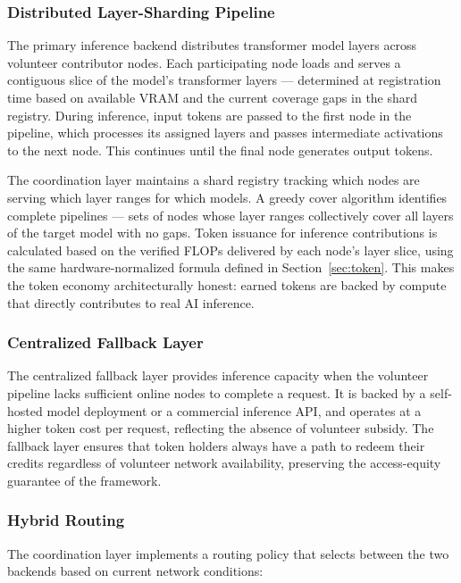 \documentclass[12pt]{article}
\begin{document}
\subsubsection{Distributed Layer-Sharding Pipeline}

The primary inference backend distributes transformer model layers across volunteer contributor nodes. Each participating node loads and serves a contiguous slice of the model's transformer layers — determined at registration time based on available VRAM and the current coverage gaps in the shard registry. During inference, input tokens are passed to the first node in the pipeline, which processes its assigned layers and passes intermediate activations to the next node. This continues until the final node generates output tokens.

The coordination layer maintains a shard registry tracking which nodes are serving which layer ranges for which models. A greedy cover algorithm identifies complete pipelines — sets of nodes whose layer ranges collectively cover all layers of the target model with no gaps. Token issuance for inference contributions is calculated based on the verified FLOPs delivered by each node's layer slice, using the same hardware-normalized formula defined in Section~\ref{sec:token}. This makes the token economy architecturally honest: earned tokens are backed by compute that directly contributes to real AI inference.

\subsubsection{Centralized Fallback Layer}

The centralized fallback layer provides inference capacity when the volunteer pipeline lacks sufficient online nodes to complete a request. It is backed by a self-hosted model deployment or a commercial inference API, and operates at a higher token cost per request, reflecting the absence of volunteer subsidy. The fallback layer ensures that token holders always have a path to redeem their credits regardless of volunteer network availability, preserving the access-equity guarantee of the framework.

\subsubsection{Hybrid Routing}

The coordination layer implements a routing policy that selects between the two backends based on current network conditions:
\end{document}
